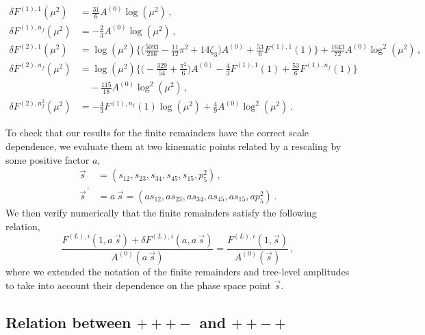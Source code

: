 \documentclass[main.tex]{subfiles}
\begin{document}
\begin{align}
\delta F^{(1),1}(\mu^2)   & =  \frac{31}{6} A^{(0)} \log(\mu^2) \,, \\
\delta F^{(1),n_f}(\mu^2) & =  - \frac{2}{3} A^{(0)} \log(\mu^2) \,, \\
\delta F^{(2),1}(\mu^2) & = \log(\mu^2) \bigg\lbrace \bigg(\frac{5093}{216} - \frac{11}{12}\pi^2 + 14 \zeta_3\bigg) A^{(0)} 
                              + \frac{53}{6}F^{(1),1}(1) \bigg\rbrace  + \frac{1643}{72} A^{(0)} \log^2(\mu^2)  \,, \\
\delta F^{(2),n_f}(\mu^2) & = \log(\mu^2) \bigg\lbrace \bigg(-\frac{329}{54} + \frac{\pi^2}{6} \bigg) A^{(0)} 
                               - \frac{4}{3}F^{(1),1}(1)  + \frac{53}{6}F^{(1),n_f}(1) \bigg\rbrace \nonumber  \\
                            & \quad - \frac{115}{18} A^{(0)} \log^2(\mu^2) \,, \\
\delta F^{(2),n_f^2}(\mu^2) & = - \frac{4}{3} F^{(1),n_f}(1) \log(\mu^2) + \frac{4}{9} A^{(0)} \log^2(\mu^2) \, . 
\end{align}
\endgroup

To check that our results for the finite remainders have the correct scale dependence, we evaluate them at two kinematic points related by a rescaling by some positive factor $a$,
\begin{equation}
\begin{aligned}
\vec{s} &= (s_{12},s_{23},s_{34},s_{45},s_{15},p_5^2) \,,  \\ 
\vec{s}^{\,'} &= a \, \vec{s} = (a s_{12},a s_{23},a s_{34},a s_{45},a s_{15},a p_5^2) \,. 
\end{aligned}
\end{equation}
We then verify numerically that the finite remainders satisfy the following relation,
\begin{equation} \label{eq:Hbbscalingrel}
  \frac{F^{(L),i}(1,a \, \vec{s})+\delta F^{(L),i}(a,a \, \vec{s})}{A^{(0)}(a\,\vec{s})} 
= \frac{F^{(L),i}(1,\vec{s})}{A^{(0)}(\vec{s})} \,,
\end{equation}
where we extended the notation of the finite remainders and tree-level amplitudes to take into account their dependence on the phase space point $\vec{s}$.


\subsection{Relation between $+++-$ and $++-+$} 
\end{document}
